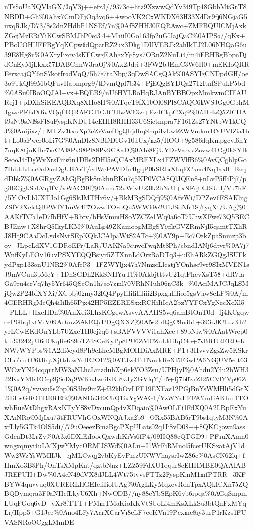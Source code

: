 \documentclass[]{article}
\begin{document}
nTsSoUaNQVlaGX/3qV3j++efx3//9373c+htz9XzwwQdYv349Tp48GbbMtGnT8NBDD+Gh\%0Ahx7CmDFjOq3vq6++wooVK2CxWKDX63H33XdDr9fj6NGjaG5uxqRJk/D73/8e2dnZHdbR1NSEf/7n\%0Af8ZHH30EQRAwc+ZMFBQUICMjAxkZGcjMzERiYiKCwSBMJhP0ej3i4+MhiiI0Go163fp2uGUajQaC\%0AIPSo//qKx+PBoUOHUFFRgYqKCpw6dQparRZ2ux3Dhg1DUVERJk2ahIkTJ2L06NHQaG6u39E8Hg8u\%0AXryIixcv4sKFCwgEAhgxYgSys7ORnZ2NuLi4/m4iERHRgBbpnDjdCnEyMjLkxx57DABChnW3raOj\%0Ax2Jdri+3FW2bJEmC3W6H0+mEKIoQRRFerxcajQY6nS7kotfrodVqQ/5h7e7taNbpj3qDwSACgQAk\%0ASYIgCNDpdGH/oe3o9TkQl99MbQFuvHabmprg9/tDvmQpl7b34+PjEQgEYDQa2712ItnfSPukP5bd\%0ASu0IBoOQJAl+vx+BQEB9/nU6HYLBoHqRJAnBYBBOpxMmkwmCIEAURej1+pDXhSiKEAQBXq8XHo8H\%0ATqcT9fX10Ol08Pl8CAQC6kWSJGg0GphMJgwePFhdX6vVQqfTQRAEGI1GJCUlwW63w+FwICkpCXq9\%0AHrIsQ5ZlCIIAt9sNt9sNl8sFl8uFyspKNDU14cEHH8RHH33U6Sictmpra7F161Zs27YNtbW1kCQJ\%0Aoijixz/+MTZv3txuXp3eZrVacfDgQbjdbqSmpiIvLw9ZWVndmrBYUVlZia1bt+Lo0aPwer0oLi7G\%0AnDlz8NBDD0Gv10dUx/nz5/HOO+9g586dqKmpgcvl6nY7uqK8tjoKfbr7mCAI8Pv98Pl88Pv9CAaD\%0AIe8FjUYDrVarvvZavw41Gg0kSYIkSeooJ4fDgWvXrsFms6n1DBs2DHl5eQCAxMREXLx4EZWVlfB6\%0AvQCghlpGo7Hdddvber0eDocDgUBArT/cdWePAVDfu4IgqP0hSRIuXbqECxcu4Nq1ax0+BzqdDhkZ\%0AGRgyZAhGjBgBk8mkhnRKu7q6KP0VCASQlJQEn8+nLvP5fIiPj7/pgi0iGjgkScLVq1fV/xWAG39f\%0Auns72vWivU23lk2bNsU+xNFqtXJSUtI/Vu7hF/5YlOvLbUXTJo1Gg6SkJMTHx6v/+BkMBgSDQfj9\%0AfvWi/DPZev6FSAKlngZSfV2XclsQBPWfY1mW4ff7OwwTOvoQu5WW99c2U1JSoNfr1S/tyqXt/UAg\%0AAKfTCb1eD7fbHfV+Rbrv/bHsVmmH8oVZCZe1Wq0a6oT7UhwXFwe73Q5BECBJEnw+X8hrQ5IkyLKM\%0AuLg49ZKamopgMBgSYitfkGVZRmNjI5qamtTXliRJ8Hq9CAaDcLvdsNvtSEpKQkJCAlpaWtS2ATc+\%0AY9p+Ec7OzkZpaSnmzp3boy+JLpcLdXV1GDRoEFr/LaR/UAKNa9euweFwqMt8Ph/cbndIANj6dtvr\%0A7j7WnfKyLEOv16uvPSXYEQQBsiyr5ZTXnnLdOrzRaDTq3+uEhARkZGQgJSUFkydPxp133onU1NR2\%0AfeP3+1FZWYljx47h7NmzcLlcatjYOnhse9vr9SIxMVEN1sJ9mVCuu3pMeY+1DnSGDh2KkSNHYuTI\%0AkbjtttvU21qtFhcvXsT58+dRVlaGa9eu4erVq7hy5Yr645QSeCn1h7so7zml70VRhN1uh06nC3k+\%0AeiMAJCJqLSMjQw2P24bfXYXi/XGbbj02my32IQ4PpyIiIiIiIiIiii2BpxgnIiIior5gsVhw8eLF\%0A/m4GERHRgMcQh4iIiIh65Pjx42HP5EZERESxxRCHiIiIqA2bzYYFCxYgNzcXeXl5+PLLL+HxeHDn\%0AnXdi3LhxKCgowAsvvAAAHS5vq6amBtOnT0d+fj4KCgqwcePGbq1vtVrV09ArtmzZAkEQcPDgQXXZ\%0A5s2bIQgC9u3b1+393rJlC1avXh2yrLCwEKdOnYLb7UZxcTH0ej3q6+sBAFVVVVi1ahXee+89bNiw\%0AAatWrep0kmS3242pU6dCkqRe689oTZ48OeKyPp8PU6ZMCZnLkIiIqC9o+7sBRERERDebNWvWYPbs\%0A2di5cyd8Ph9cLhcMBgMOHDiAxMRE+P1+3HvvvZgzZw5KSkrCLr/rrrtC6tRqtXjttdcwYcIE2O12\%0ATJw4ETNnzkReXl5E6wPA6NGjUV5ert63WCwYN24cqqurMW3aNLhcLmzduhXp6ekYO3Zsu/UPHjyI\%0Abdu2Ydu2bWH322KxYMKECep9j8cDq9WKnJwciKKI8vJyZGVlqY/n5+fj7bffxrZt25CVlYVp06Z1\%0A2q/vvvsu5s2bp06S3hv9mZ+f32kbOvLFF19EXFav12PGjBnYsWMHli5dGtX2iIiIosGROERERESt\%0ANDc349ChQ1ixYgWAG1/YzWYzBEFAYmIiAKhnl1TOwhRueVtDhgxRAxKTyYS8vDxcunQp4vXDqaio\%0AwOLFi1FdXQ0A2LRpExYuXAiNRoOMjIxu73tFRUVIiGOxWNQAJxa2b9+ORx55BAB6rT9bs1qtyM3N\%0AxfLly5GTk4OlS5di//79uOeeezBmzBgcPXpULats02q1Ii8vD08++SQKCgowa9assGdenDt3LrZv\%0A3x6DXiEiIoocQxwiIiKiVs6fP4/09HQ88cQTGD9+PFauXAmn0wngxqmyi4uLMXjwYMycORMlJSWd\%0ALu+I1WrFiRMnol5fcerUKSxatAjV1dWw2WzYsWMHJk+ejMLCwqj2vbKyEvPmzUNWVhaysrIwZ86c\%0AsCN62lq+fHmXo3B8Ph/OnTsXMpKnt/qztbNnz+LZZ59FdXU1qqur8cEHHMBE0QAAIABJREFUH+Dw\%0A4cN49dVX8dJLL4Wt75tvvsFTTz2FyspKmM1mfPTRR+3KFBYW4quvvuq0XURERLHGEIeIiIiolUAg\%0AgLKyMqxevRonTpxAQkICXn75ZQBQDymqra3F0aNHcfLkyU6Xh+NwODB//ny88cYbSEpK6vb6ipqa\%0AGqSmpmLUqFGoq6vD+vXr8fTTT+PMmTMoKioKKVtSUoLi4mKsXLkSu3btQnFxMYqLi/Hpp5+G1Jee\%0Ano4LFy7AarXCarVi8eLF7eqKVn19Pcxmc8iy3urP1rKzs1FUVASNRoOCggLMmDE
\end{document}
